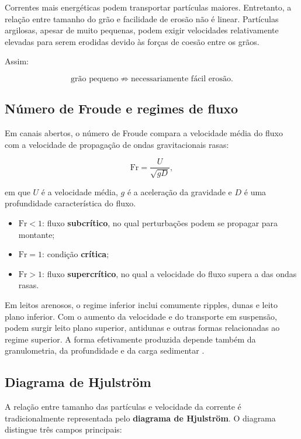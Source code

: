 Correntes mais energéticas podem transportar partículas maiores. Entretanto, a
relação entre tamanho do grão e facilidade de erosão não é linear. Partículas
argilosas, apesar de muito pequenas, podem exigir velocidades relativamente
elevadas para serem erodidas devido às forças de coesão entre os grãos.

Assim:

\[
\text{grão pequeno}
\not\Rightarrow
\text{necessariamente fácil erosão}.
\]

\subsection{Número de Froude e regimes de fluxo}

Em canais abertos, o número de Froude compara a velocidade média do fluxo com a velocidade de propagação de ondas gravitacionais rasas:

\[
\mathrm{Fr}=\frac{U}{\sqrt{gD}},
\]

em que \(U\) é a velocidade média, \(g\) é a aceleração da gravidade e \(D\) é uma profundidade característica do fluxo.

\begin{itemize}
  \item \(\mathrm{Fr}<1\): fluxo \textbf{subcrítico}, no qual perturbações podem se propagar para montante;
  \item \(\mathrm{Fr}=1\): condição \textbf{crítica};
  \item \(\mathrm{Fr}>1\): fluxo \textbf{supercrítico}, no qual a velocidade do fluxo supera a das ondas rasas.
\end{itemize}

Em leitos arenosos, o regime inferior inclui comumente ripples, dunas e leito plano inferior. Com o aumento da velocidade e do transporte em suspensão, podem surgir leito plano superior, antidunas e outras formas relacionadas ao regime superior. A forma efetivamente produzida depende também da granulometria, da profundidade e da carga sedimentar \parencite{harms1975,nichols2009}.

\subsection{Diagrama de Hjulström}

A relação entre tamanho das partículas e velocidade da corrente é
tradicionalmente representada pelo \textbf{diagrama de Hjulström}. O diagrama
distingue três campos principais:

